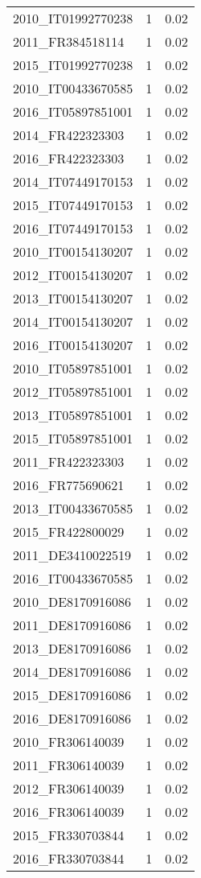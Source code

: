 \begin{table*}[htbp]
\begin{tabular}{lrr}
2010_IT01992770238 & 1 & 0.02 \\
2011_FR384518114 & 1 & 0.02 \\
2015_IT01992770238 & 1 & 0.02 \\
2010_IT00433670585 & 1 & 0.02 \\
2016_IT05897851001 & 1 & 0.02 \\
2014_FR422323303 & 1 & 0.02 \\
2016_FR422323303 & 1 & 0.02 \\
2014_IT07449170153 & 1 & 0.02 \\
2015_IT07449170153 & 1 & 0.02 \\
2016_IT07449170153 & 1 & 0.02 \\
2010_IT00154130207 & 1 & 0.02 \\
2012_IT00154130207 & 1 & 0.02 \\
2013_IT00154130207 & 1 & 0.02 \\
2014_IT00154130207 & 1 & 0.02 \\
2016_IT00154130207 & 1 & 0.02 \\
2010_IT05897851001 & 1 & 0.02 \\
2012_IT05897851001 & 1 & 0.02 \\
2013_IT05897851001 & 1 & 0.02 \\
2015_IT05897851001 & 1 & 0.02 \\
2011_FR422323303 & 1 & 0.02 \\
2016_FR775690621 & 1 & 0.02 \\
2013_IT00433670585 & 1 & 0.02 \\
2015_FR422800029 & 1 & 0.02 \\
2011_DE3410022519 & 1 & 0.02 \\
2016_IT00433670585 & 1 & 0.02 \\
2010_DE8170916086 & 1 & 0.02 \\
2011_DE8170916086 & 1 & 0.02 \\
2013_DE8170916086 & 1 & 0.02 \\
2014_DE8170916086 & 1 & 0.02 \\
2015_DE8170916086 & 1 & 0.02 \\
2016_DE8170916086 & 1 & 0.02 \\
2010_FR306140039 & 1 & 0.02 \\
2011_FR306140039 & 1 & 0.02 \\
2012_FR306140039 & 1 & 0.02 \\
2016_FR306140039 & 1 & 0.02 \\
2015_FR330703844 & 1 & 0.02 \\
2016_FR330703844 & 1 & 0.02 \\

\end{tabular}
\end{table*}
